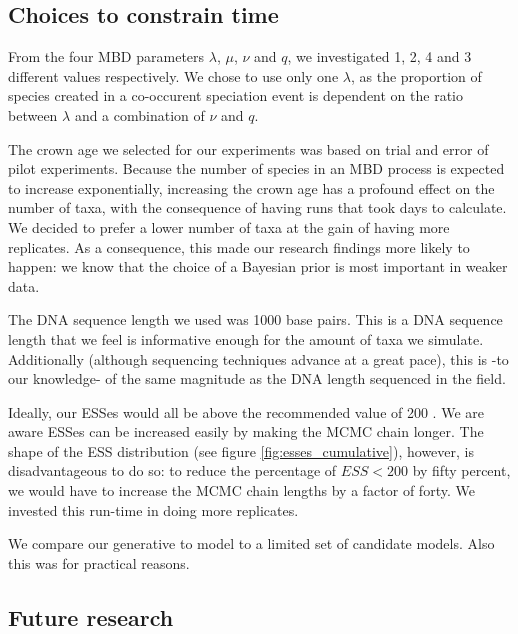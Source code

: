\subsection{Choices to constrain time}

From the four MBD parameters $\lambda$, $\mu$, $\nu$ and $q$,
we investigated 1, 2, 4 and 3 different values respectively.
We chose to use only one $\lambda$, as the proportion of species
created in a co-occurent speciation event is dependent on the ratio
between $\lambda$ and a combination of $\nu$ and $q$.  

The crown age we selected for our experiments was based on trial and error
of pilot experiments. Because the number of species in an MBD process is
expected to increase exponentially, increasing the crown age has a
profound effect on the number of taxa, with the consequence of having
runs that took days to calculate. We decided to prefer a lower number of
taxa at the gain of having more replicates. As a consequence, 
this made our research findings 
 more likely to happen: we know that the
choice of a Bayesian prior is most important in weaker data. 

The DNA sequence length we used was 1000 base pairs. This is a DNA
sequence length that we  feel is informative enough
for the amount of taxa we simulate. Additionally (although sequencing
techniques advance at a great pace), this is -to our knowledge- 
of the same magnitude as the DNA length sequenced in the field.

Ideally, our ESSes would all be above the recommended value of 
200 . We are aware ESSes can be increased easily by
making the MCMC chain longer. The shape of the ESS distribution
(see figure \ref{fig:esses_cumulative}), however, is disadvantageous
to do so: to reduce the percentage of $ESS < 200$ by fifty percent,
we would have to increase the MCMC chain lengths by a factor of forty.
We invested this run-time in doing more replicates.

We compare our generative to model to  
a limited set of candidate models. Also this was for practical
reasons.

\subsection{Future research}

